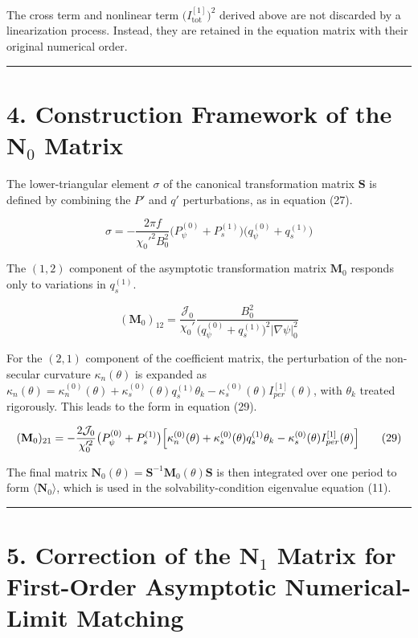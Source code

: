 \documentclass[11pt,a4paper]{article}
\begin{document}
The cross term and nonlinear term \(\bigl(I_{\mathrm{tot}}^{[1]}\bigr)^2\) derived
above are not discarded by a linearization process. Instead, they are retained in
the equation matrix with their original numerical order.

\begin{center}\rule{0.5\linewidth}{0.5pt}\end{center}

\section{4. Construction Framework of the \(\mathbf{N}_0\) Matrix}\label{construction-framework-of-the-n0-matrix}

The lower-triangular element \(\sigma\) of the canonical transformation matrix
\(\mathbf{S}\) is defined by combining the \(P'\) and \(q'\) perturbations, as in
equation (27).

\[ \sigma = -\frac{2\pi f}{\chi_0'^2 B_0^2} \bigl(P_\psi^{(0)}+P_s^{(1)}\bigr) \bigl(q_\psi^{(0)}+q_s^{(1)}\bigr) \tag{27} \]

The \((1,2)\) component of the asymptotic transformation matrix \(\mathbf{M}_0\)
responds only to variations in \(q_s^{(1)}\).

\[ (\mathbf{M}_0)_{12} = \frac{\mathcal{J}_0}{\chi_0'} \frac{B_0^2}{\bigl(q_\psi^{(0)}+q_s^{(1)}\bigr)^2|\nabla\psi|_0^2} \tag{28} \]

For the \((2,1)\) component of the coefficient matrix, the perturbation of the
non-secular curvature \(\kappa_n(\theta)\) is expanded as
\(\kappa_n(\theta) = \kappa_n^{(0)}(\theta) + \kappa_s^{(0)}(\theta)q_s^{(1)}\theta_k - \kappa_s^{(0)}(\theta)I_{per}^{[1]}(\theta)\),
with \(\theta_k\) treated rigorously. This leads to the form in equation (29).

\[ (\mathbf{M}_0)_{21} = -\frac{2\mathcal{J}_0}{\chi_0'^2} \bigl(P_\psi^{(0)}+P_s^{(1)}\bigr) \Bigl[ \kappa_n^{(0)}(\theta) + \kappa_s^{(0)}(\theta)q_s^{(1)}\theta_k - \kappa_s^{(0)}(\theta)I_{per}^{[1]}(\theta) \Bigr] \tag{29} \]

The final matrix
\(\mathbf{N}_0(\theta) = \mathbf{S}^{-1}\mathbf{M}_0(\theta)\mathbf{S}\) is then
integrated over one period to form \(\langle \mathbf{N}_0 \rangle\), which is used
in the solvability-condition eigenvalue equation (11).

\begin{center}\rule{0.5\linewidth}{0.5pt}\end{center}

\section{5. Correction of the \(\mathbf{N}_1\) Matrix for First-Order Asymptotic Numerical-Limit Matching}\label{correction-of-n1-matrix-for-first-order-asymptotic-numerical-limit-matching}
\end{document}
